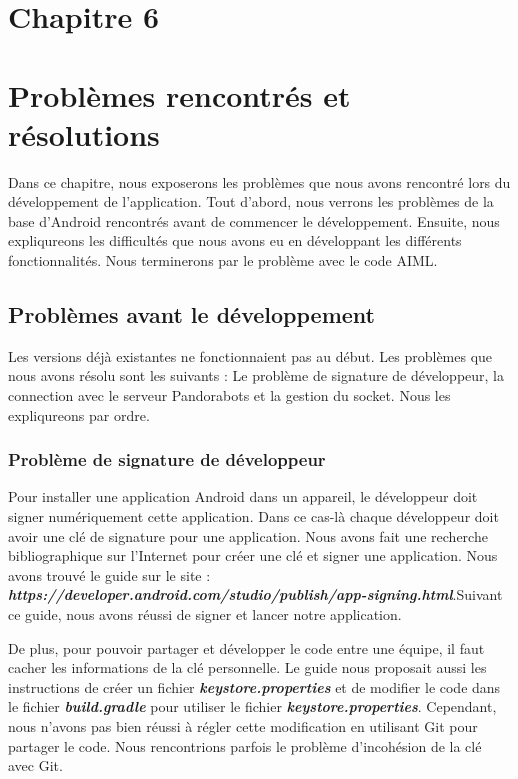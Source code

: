 \section*{Chapitre 6}
\section{Problèmes rencontrés et résolutions}

\indent Dans ce chapitre, nous exposerons les problèmes que nous avons rencontré lors du développement de l'application. Tout d'abord, nous verrons les problèmes de la base d'Android rencontrés avant de commencer le développement. Ensuite, nous expliqureons les difficultés que nous avons eu en développant les différents fonctionnalités. Nous terminerons par le problème avec le code AIML.

\subsection{Problèmes avant le développement}

\indent Les versions déjà existantes ne fonctionnaient pas au début. Les problèmes que nous avons résolu sont les suivants : Le problème de signature de développeur, la connection avec le serveur Pandorabots et la gestion du socket. Nous les expliqureons par ordre.

\subsubsection{Problème de signature de développeur}

\indent Pour installer une application Android dans un appareil, le développeur doit signer numériquement cette application. Dans ce cas-là chaque développeur doit avoir une clé de signature pour une application. Nous avons fait une recherche bibliographique sur l'Internet pour créer une clé et signer une application. Nous avons trouvé le guide sur le site : \textbf{\emph{https://developer.android.com/studio/publish/app-signing.html}}.Suivant ce guide, nous avons réussi de signer et lancer notre application.

\indent De plus, pour pouvoir partager et développer le code entre une équipe, il faut cacher les informations de la clé personnelle. Le guide nous proposait aussi les instructions de créer un fichier \textbf{\emph{keystore.properties}} et de modifier le code dans le fichier \textbf{\emph{build.gradle}} pour utiliser le fichier \textbf{\emph{keystore.properties}}. Cependant, nous n'avons pas bien réussi à régler cette modification en utilisant Git pour partager le code. Nous rencontrions parfois le problème d'incohésion de la clé avec Git.

